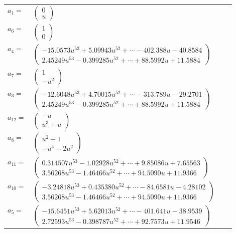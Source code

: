 \documentclass[1p]{elsarticle_modified}
\theoremstyle{definition}
\begin{document}
\begin{tabular}{m{7pt} m{180pt} m{7pt} m{180pt} }
\flushright $a_{1}=$&$\begin{pmatrix}0\\u\end{pmatrix}$ \\
\flushright $a_{6}=$&$\begin{pmatrix}1\\0\end{pmatrix}$ \\
\flushright $a_{4}=$&$\begin{pmatrix}-15.0573 u^{53}+5.09943 u^{52}+\cdots-402.388 u-40.8584\\2.45249 u^{53}-0.399285 u^{52}+\cdots+88.5992 u+11.5884\end{pmatrix}$ \\
\flushright $a_{7}=$&$\begin{pmatrix}1\\- u^2\end{pmatrix}$ \\
\flushright $a_{3}=$&$\begin{pmatrix}-12.6048 u^{53}+4.70015 u^{52}+\cdots-313.789 u-29.2701\\2.45249 u^{53}-0.399285 u^{52}+\cdots+88.5992 u+11.5884\end{pmatrix}$ \\
\flushright $a_{12}=$&$\begin{pmatrix}- u\\u^3+u\end{pmatrix}$ \\
\flushright $a_{8}=$&$\begin{pmatrix}u^2+1\\- u^4-2 u^2\end{pmatrix}$ \\
\flushright $a_{11}=$&$\begin{pmatrix}0.314507 u^{53}-1.02928 u^{52}+\cdots+9.85086 u+7.65563\\3.56268 u^{53}-1.46466 u^{52}+\cdots+94.5090 u+11.9366\end{pmatrix}$ \\
\flushright $a_{10}=$&$\begin{pmatrix}-3.24818 u^{53}+0.435380 u^{52}+\cdots-84.6581 u-4.28102\\3.56268 u^{53}-1.46466 u^{52}+\cdots+94.5090 u+11.9366\end{pmatrix}$ \\
\flushright $a_{5}=$&$\begin{pmatrix}-15.6451 u^{53}+5.62013 u^{52}+\cdots-401.641 u-38.9539\\2.72593 u^{53}-0.398787 u^{52}+\cdots+92.7573 u+11.9546\end{pmatrix}$ \\

\end{tabular}
\end{document}
